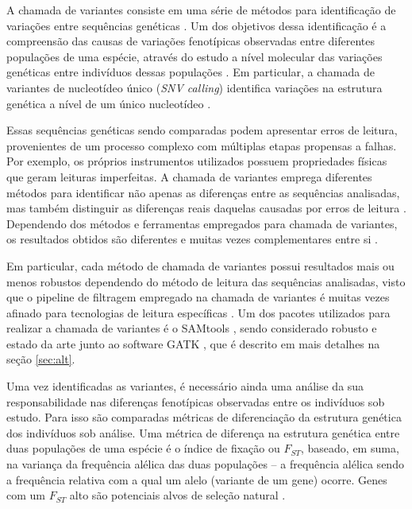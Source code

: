 \documentclass[cic,tc]{iiufrgs}
\begin{document}
A chamada de variantes consiste em uma série de métodos para identificação de
variações entre sequências genéticas \cite{nielsen2011genotype}. Um dos
objetivos dessa identificação é a compreensão das causas de variações
fenotípicas observadas entre diferentes populações de uma espécie, através do
estudo a nível molecular das variações genéticas entre indivíduos dessas
populações \cite{jiang2019population}. Em particular, a chamada de variantes de
nucleotídeo único (\textit{SNV calling}) identifica variações na estrutura
genética a nível de um único nucleotídeo \cite{khurana2016role}.

Essas sequências genéticas sendo comparadas podem apresentar erros de leitura,
provenientes de um processo complexo com múltiplas etapas propensas a falhas.
Por exemplo, os próprios instrumentos utilizados possuem propriedades físicas
que geram leituras imperfeitas. A chamada de variantes emprega diferentes
métodos para identificar não apenas as diferenças entre as sequências
analisadas, mas também distinguir as diferenças reais daquelas causadas por
erros de leitura \cite{poplin2018universal}. Dependendo dos métodos e
ferramentas empregados para chamada de variantes, os resultados obtidos são
diferentes e muitas vezes complementares entre
si \cite{hwang2015systematic} \cite{gezsi2015variantmetacaller} \cite{guo2015seqmule}.

Em particular, cada método de chamada de variantes possui resultados mais ou
menos robustos dependendo do método de leitura das sequências analisadas, visto
que o pipeline de filtragem empregado na chamada de variantes é muitas vezes
afinado para tecnologias de leitura específicas \cite{poplin2018universal}. Um
dos pacotes utilizados para realizar a chamada de variantes é o
SAMtools \cite{pirooznia2014validation}, sendo considerado robusto e estado da
arte junto ao software
GATK \cite{crysnanto2019accurate} \cite{hwang2015systematic}
\cite{yao2020evaluation} \cite{poplin2018universal}, que é descrito em mais
detalhes na seção \ref{sec:alt}.

Uma vez identificadas as variantes, é necessário ainda uma análise da sua
responsabilidade nas diferenças fenotípicas observadas entre os indivíduos sob
estudo. Para isso são comparadas métricas de diferenciação da estrutura
genética dos indivíduos sob análise. Uma métrica de diferença na estrutura
genética entre duas populações de uma espécie é o índice de fixação ou
$F_{ST}$, baseado, em suma, na variança da frequência alélica das duas
populações -- a frequência alélica sendo a frequência relativa com a qual um
alelo (variante de um gene) ocorre. Genes com um $F_{ST}$ alto são potenciais
alvos de seleção natural \cite{yi2010sequencing}.
\end{document}
